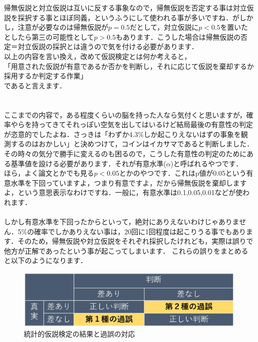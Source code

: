 \documentclass[11pt,a4paper,uplatex]{ujreport} 	%
\begin{document}
帰無仮説と対立仮説は互いに反する事象なので，帰無仮説を否定する事は対立仮説を採択する事とほぼ同義，というふうにして使われる事が多いですね．がしかし，注意が必要なのは帰無仮説が$p=0.5$だとして，対立仮説に$p<0.5$を置いたとしたら第三の可能性として$p>0.5$もあります．こうした場合は帰無仮説の否定＝対立仮説の採択とは違うので気を付ける必要があります．\\


以上の内容を言い換え，改めて仮説検定とは何か考えると，\\
「用意された仮説が有意であるか否かを判断し，それに応じて仮説を棄却するか採用するか判定する作業」\\
であると言えます．\\
\\
\\

ここまでの内容で，ある程度くらいの脳を持った人なら気付くと思いますが，確率やらを持ってきてそれっぽい空気を出してはいるけど結局最後の有意性の判定が恣意的でしたよね．さっきは「わずか4.3\%しか起こりえないはずの事象を観測するのはおかしい」と決めつけて，コインはイカサマであると判断しました．\\

その時々の気分で勝手に変えるのも困るので，こうした有意性の判定のためにある基準値を設ける必要があります．それが有意水準($\alpha$)と呼ばれるやつです．\\

ほら，よく論文とかでも見る$p<0.05$とかのやつです．これはp値が0.05という有意水準を下回っていますよ，つまり有意ですよ，だから帰無仮説を棄却しますよ，という意思表示なわけですね．一般に，有意水準は0.1,0.05,0.01などが使われます．\\
\\

しかし有意水準を下回ったからといって，絶対にありえないわけじゃありません．5\%の確率でしかありえない事は，20回に1回程度は起こりうる事でもあります．そのため，帰無仮説や対立仮説をそれぞれ採択したけれども，実際は誤りで他方が正解であったという事が起こってしまいます．
これらの誤りをまとめると以下のようになります．

\begin{figure}[H]
  \includegraphics[width=15cm]{../figures/miss.eps}
  \caption{統計的仮説検定の結果と過誤の対応}
\end{figure}
\end{document}
